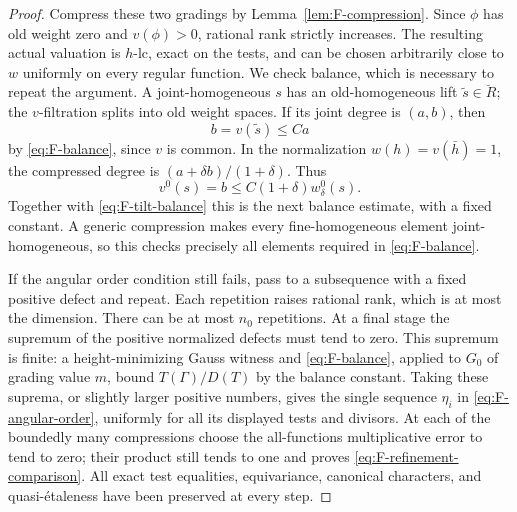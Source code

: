 \begin{proof}
Compress these two gradings by Lemma~\ref{lem:F-compression}.
Since $\phi$ has old weight zero and $v(\phi)>0$, rational rank
strictly increases.  The resulting actual valuation is $h$-lc,
exact on the tests, and can be chosen arbitrarily close to $w$
uniformly on every regular function.  We check balance, which
is necessary to repeat the argument.  A joint-homogeneous $s$
has an old-homogeneous lift $\widetilde s\in\breve R$; the
$v$-filtration splits into old weight spaces.  If its joint
degree is $(a,b)$, then
\[
 b=v(\widetilde s)\le Ca
\]
by \eqref{eq:F-balance}, since $v$ is common.  In the
normalization $w(h)=v(\bar h)=1$, the compressed degree is
$(a+\delta b)/(1+\delta)$.  Thus
\[
 v^0(s)=b\le C(1+\delta)w_\delta^0(s).
\]
Together with \eqref{eq:F-tilt-balance} this is the next
balance estimate, with a fixed constant.  A generic compression
makes every fine-homogeneous element joint-homogeneous, so this
checks precisely all elements required in \eqref{eq:F-balance}.

If the angular order condition still fails, pass to a subsequence
with a fixed positive defect and repeat.  Each repetition raises
rational rank, which is at most the dimension.  There can be at
most $n_0$ repetitions.  At a final stage the supremum of the
positive normalized defects must tend to zero.  This supremum is
finite: a height-minimizing Gauss witness and
\eqref{eq:F-balance}, applied to $G_0$ of grading value $m$,
bound $T(\Gamma)/D(T)$ by the balance constant.
Taking these suprema, or slightly larger positive numbers, gives
the single sequence $\eta_i$ in \eqref{eq:F-angular-order},
uniformly for all its displayed tests and divisors.
At each of the boundedly many compressions choose the
all-functions multiplicative error to tend to zero; their product
still tends to one and proves \eqref{eq:F-refinement-comparison}.
All exact test equalities, equivariance, canonical characters,
and quasi-\'{e}taleness have been preserved at every step.
\end{proof}

